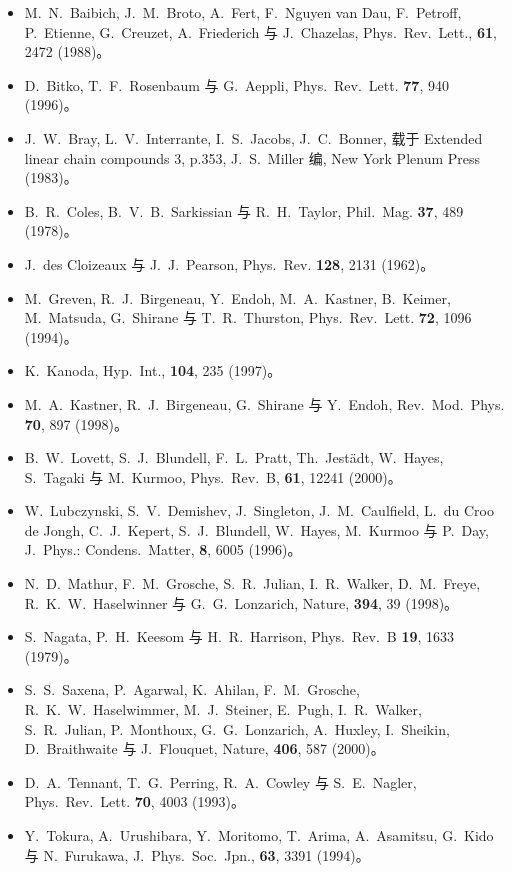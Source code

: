 \begin{itemize}[itemsep=0.2em]
\item M.~N.~Baibich, J.~M.~Broto, A.~Fert, F.~Nguyen van Dau, F.~Petroff,
P.~Etienne, G.~Creuzet, A.~Friederich 与 J.~Chazelas, Phys.~Rev.~Lett., \textbf{61},
2472 (1988)。
\item D.~Bitko, T.~F.~Rosenbaum 与 G.~Aeppli, Phys.~Rev.~Lett. \textbf{77}, 940
(1996)。
\item J.~W.~Bray, L.~V.~Interrante, I.~S.~Jacobs, J.~C.~Bonner, 载于 Extended
linear chain compounds 3, p.353, J.~S.~Miller 编, New York Plenum Press (1983)。
\item B.~R.~Coles, B.~V.~B.~Sarkissian 与 R.~H.~Taylor, Phil.~Mag. \textbf{37},
489 (1978)。
\item J.~des Cloizeaux 与 J.~J.~Pearson, Phys.~Rev. \textbf{128}, 2131 (1962)。
\item M.~Greven, R.~J.~Birgeneau, Y.~Endoh, M.~A.~Kastner, B.~Keimer, M.~Matsuda,
G.~Shirane 与 T.~R.~Thurston, Phys.~Rev.~Lett. \textbf{72}, 1096 (1994)。
\item K.~Kanoda, Hyp.~Int., \textbf{104}, 235 (1997)。
\item M.~A.~Kastner, R.~J.~Birgeneau, G.~Shirane 与 Y.~Endoh, Rev.~Mod.~Phys.
\textbf{70}, 897 (1998)。
\item B.~W.~Lovett, S.~J.~Blundell, F.~L.~Pratt, Th.~Jest\"{a}dt, W.~Hayes,
S.~Tagaki 与 M.~Kurmoo, Phys.~Rev.~B, \textbf{61}, 12241 (2000)。
\item W.~Lubczynski, S.~V.~Demishev, J.~Singleton, J.~M.~Caulfield, L.~du Croo de
Jongh, C.~J.~Kepert, S.~J.~Blundell, W.~Hayes, M.~Kurmoo 与 P.~Day, J.~Phys.:
Condens.~Matter, \textbf{8}, 6005 (1996)。
\item N.~D.~Mathur, F.~M.~Grosche, S.~R.~Julian, I.~R.~Walker, D.~M.~Freye,
R.~K.~W.~Haselwinner 与 G.~G.~Lonzarich, Nature, \textbf{394}, 39 (1998)。
\item S.~Nagata, P.~H.~Keesom 与 H.~R.~Harrison, Phys.~Rev.~B \textbf{19}, 1633
(1979)。
\item S.~S.~Saxena, P.~Agarwal, K.~Ahilan, F.~M.~Grosche, R.~K.~W.~Haselwimmer,
M.~J.~Steiner, E.~Pugh, I.~R.~Walker, S.~R.~Julian, P.~Monthoux, G.~G.~Lonzarich,
A.~Huxley, I.~Sheikin, D.~Braithwaite 与 J.~Flouquet, Nature, \textbf{406}, 587
(2000)。
\item D.~A.~Tennant, T.~G.~Perring, R.~A.~Cowley 与 S.~E.~Nagler, Phys.~Rev.~Lett.
\textbf{70}, 4003 (1993)。
\item Y.~Tokura, A.~Urushibara, Y.~Moritomo, T.~Arima, A.~Asamitsu, G.~Kido 与
N.~Furukawa, J.~Phys.~Soc.~Jpn., \textbf{63}, 3391 (1994)。
\end{itemize}
